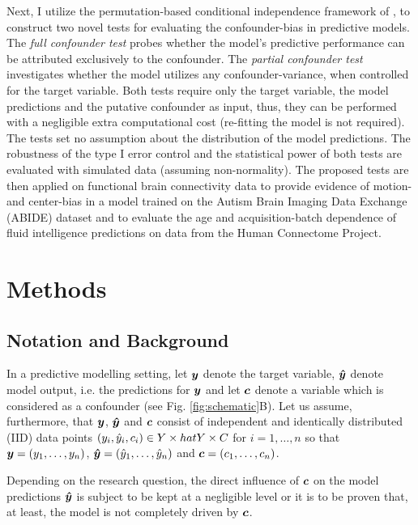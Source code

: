 \documentclass{article}
\begin{document}
Next, I utilize the permutation-based conditional independence framework of \cite{berrett2020conditional}, to construct two novel tests for evaluating the confounder-bias in predictive models.
The \emph{full confounder test} probes whether the model's predictive performance can be attributed exclusively to the confounder.
The \emph{partial confounder test} investigates whether the model utilizes any confounder-variance, when controlled for the target variable.
Both tests require only the target variable, the model predictions and the putative confounder as input, thus, they can be performed with a negligible extra computational cost (re-fitting the model is not required).
The tests set no assumption about the distribution of the model predictions.
The robustness of the type I error control and the statistical power of both tests are evaluated with simulated data (assuming non-normality).
The proposed tests are then applied on functional brain connectivity data to provide evidence of motion- and center-bias in a model trained on the Autism Brain Imaging Data Exchange (ABIDE) dataset \citep{di2014autism} and to evaluate the age and acquisition-batch dependence of fluid intelligence predictions on data from the Human Connectome Project.

\section{Methods}

\subsection{Notation and Background}

In a predictive modelling setting, let $\boldsymbol{y}$ denote the target variable, $\boldsymbol{\hat{y}}$ denote model output, i.e. the predictions for $\boldsymbol{y}$ and let $\boldsymbol{c}$ denote a variable which is considered as a confounder (see Fig. \ref{fig:schematic}B). Let us assume, furthermore, that $\boldsymbol{y}$, $\boldsymbol{\hat{y}}$ and $\boldsymbol{c}$ consist of independent and identically distributed (IID) data points $(y_i, \hat{y}_i, c_i) \in Y \times \\hat{Y} \times C$ for $i=1, \dots , n$ so that $\boldsymbol{y}=(y_1, \dots ,y_n)$, $\boldsymbol{\hat{y}}=(\hat{y}_1, \dots, \hat{y}_n)$ and $\boldsymbol{c}=(c_1, \dots, c_n)$. 

Depending on the research question, the direct influence of $\boldsymbol{c}$ on the model predictions $\boldsymbol{\hat{y}}$ is subject to be kept at a negligible level or it is to be proven that, at least, the model is not completely driven by $\boldsymbol{c}$.
\end{document}
